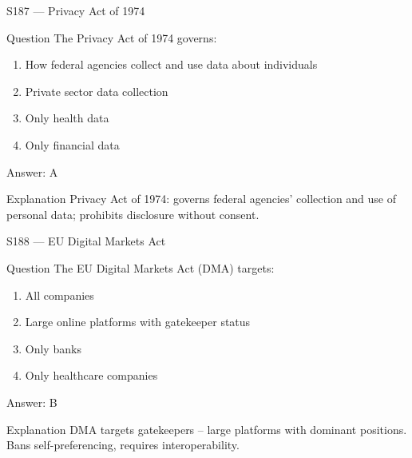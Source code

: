 \documentclass[aspectratio=169,8pt]{beamer}
\begin{document}
	\begin{frame}{S187 --- Privacy Act of 1974}
		\begin{block}{Question}
			The Privacy Act of 1974 governs:
			\begin{enumerate}
				\item How federal agencies collect and use data about individuals
				\item Private sector data collection
				\item Only health data
				\item Only financial data
			\end{enumerate}
		\end{block}
		\begin{exampleblock}{Answer: A}\end{exampleblock}
		\begin{block}{Explanation}
			Privacy Act of 1974: governs federal agencies' collection and use of personal data; prohibits disclosure without consent.
		\end{block}
	\end{frame}
	
	\begin{frame}{S188 --- EU Digital Markets Act}
		\begin{block}{Question}
			The EU Digital Markets Act (DMA) targets:
			\begin{enumerate}
				\item All companies
				\item Large online platforms with gatekeeper status
				\item Only banks
				\item Only healthcare companies
			\end{enumerate}
		\end{block}
		\begin{exampleblock}{Answer: B}\end{exampleblock}
		\begin{block}{Explanation}
			DMA targets gatekeepers -- large platforms with dominant positions. Bans self-preferencing, requires interoperability.
		\end{block}
	\end{frame}
	
\end{document}
